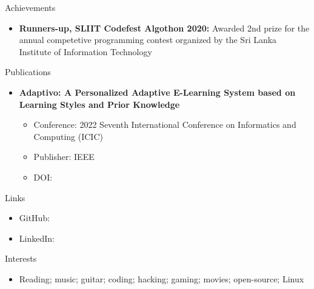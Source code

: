 \documentclass[garamond, a4paper]{modest-cv}
\begin{document}
	\begin{cvsection}{Achievements}
		\begin{cvsubsection}{}{}{}
			\begin{itemize}
				\item \textbf{Runners-up, SLIIT Codefest Algothon 2020:} Awarded 2nd prize for the annual competetive programming contest organized by the Sri Lanka Institute of Information Technology
			\end{itemize}
		\end{cvsubsection}
	\end{cvsection}

	\begin{cvsection}{Publications}
		\begin{cvsubsection}{}{}{}
			\begin{itemize}
				\item \textbf{Adaptivo: A Personalized Adaptive E-Learning System based on Learning Styles and Prior Knowledge}
				\begin{itemize}
					\item Conference: 2022 Seventh International Conference on Informatics and Computing (ICIC)
					\item Publisher: IEEE
					\item DOI: \ttfamily {}
				\end{itemize}
			\end{itemize}
		\end{cvsubsection}
	\end{cvsection}

	\begin{cvsection}{Links}
		\begin{cvsubsection}{}{}{}
			\begin{itemize}
				\item GitHub: \small {} \normalsize
				\item LinkedIn: \small {}
			\end{itemize}
		\end{cvsubsection}
	\end{cvsection}

	\begin{cvsection}{Interests}
		\begin{cvsubsection}{}{}{}
			\begin{itemize}
				\item Reading; music; guitar; coding; hacking; gaming; movies; open-source; Linux
			\end{itemize}
		\end{cvsubsection}
	\end{cvsection}
\end{document}
